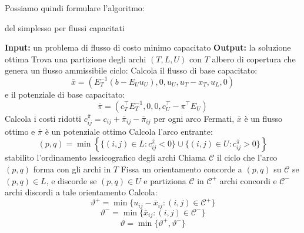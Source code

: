 \documentclass[a4paper,11pt]{article}
\begin{document}
Possiamo quindi formulare l'algoritmo:
\begin{algorithm}[H]
\caption{del simplesso per flussi capacitati}
\begin{algorithmic}
	\STATE \textbf{Input:} un problema di flusso di costo minimo capacitato
	\STATE \textbf{Output:} la soluzione ottima 
	\STATE Trova una partizione degli archi $(T,L,U)$ con $T$ albero di copertura che genera un flusso ammissibile
	\STATE \textsf{ciclo:}
	\STATE Calcola il flusso di base capacitato:
	$$
	\bar{x} = \left(E_T^{-1} (b - E_U u_U), 0, u_U, u_T - x_T, u_L, 0\right) $$
	e il potenziale di base capacitato:
	$$
	\bar{\pi} = \left( c_T^\intercal E_T^{-1}, 0, 0, c_U^\intercal - \pi^\intercal E_U \right)
	$$
	\STATE Calcola i costi ridotti $c_{ij}^{\bar{\pi}} = c_{ij} + \bar{\pi}_{ij} - \bar{\pi}_{ij}$ per ogni arco
	\STATE Fermati, $\bar{x}$ è un flusso ottimo e $\bar{\pi}$ è un potenziale ottimo
\ELSE
		\STATE Calcola l'arco entrante: 
		$$
		(p, q) = \min \left\{ \{ (i, j) \in L : c_{ij}^{\bar{\pi}} < 0 \} \cup \{ (i, j) \in U : c_{ij}^{\bar{\pi}} > 0 \} \right\}
		$$
		stabilito l'ordinamento lessicografico degli archi
		\STATE Chiama $\mathcal{C}$ il ciclo che l'arco $(p, q)$ forma con gli archi in $T$
		\STATE Fissa un orientamento concorde a $(p,q)$ su $\mathcal{C}$ se $(p,q) \in L$, e discorde se $(p,q) \in U$ e partiziona $\mathcal{C}$ in $\mathcal{C^+}$ archi concordi e $\mathcal{C^-}$ archi discordi a tale orientamento
	\ENDIF
		\STATE Calcola:
		$$
		\vartheta^+ = \min\{ u_{ij} - \bar{x}_{ij} : (i, j) \in \mathcal{C}^+ \}
		$$
		$$
		\vartheta^- = \min\{ \bar{x}_{ij} : (i, j) \in \mathcal{C}^- \}
		$$
		$$
		\vartheta = \min\{\vartheta^+, \vartheta^-\}
		$$

\end{algorithmic}
\end{algorithm}
\end{document}
